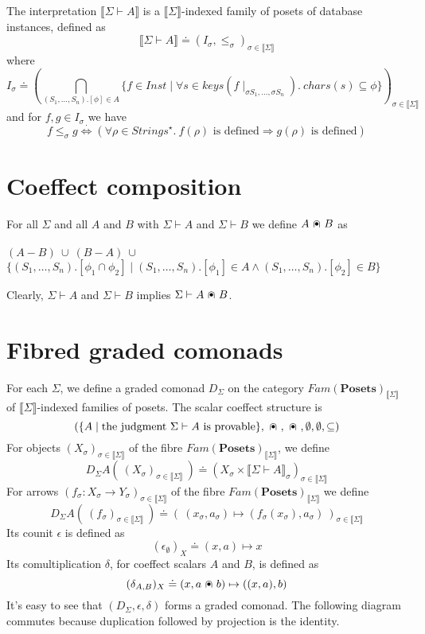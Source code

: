 \documentclass{article}
\newcommand{\mbf}{\mathbf}
\newcommand{\sem}[1]{\llbracket #1 \rrbracket}
\newcommand{\capdot}{~\stackinset{c}{}{c}{}{\scalebox{0.8}{$\bullet$}}{$\cap$}~}
\newcommand{\sdisp}[1]{
\left( #1 \right)
}
\begin{document}
The interpretation $\sem{\Sigma \vdash A}$ is a $\sem{\Sigma}$-indexed family of posets of database instances, defined as $$\sem{\Sigma \vdash A} \doteq (I_\sigma, \leq_\sigma)_{\sigma \in \sem{\Sigma}}$$ where $$I_\sigma \doteq \sdisp{\bigcap_{(S_1,\ldots,S_n).[\phi] \in A} \{ f \in \mathit{Inst} \mid \forall s \in \mathit{keys}(f \! \mid_{\sigma S_1, \ldots, \sigma S_n}).~\mathit{chars}(s) \subseteq \phi \}}_{\sigma \in \sem{\Sigma}}$$ and for $f,g \in I_{\sigma}$ we have
$$f \leq_\sigma g \overset{\cdot}{\Leftrightarrow} (\forall \rho \in \mathit{Strings}^\star.~f(\rho) \text{ is defined} \Rightarrow g(\rho) \text{ is defined})$$
 
\section*{Coeffect composition}

For all $\Sigma$ and all $A$ and $B$ with $\Sigma \vdash A$ and $\Sigma \vdash B$ we define $A \capdot B$ as\\~\\
$(A - B)~\cup~(B - A)~\cup$\\
$\{ (S_1,\ldots,S_n).[\phi_1 \cap \phi_2] \mid (S_1,\ldots,S_n).[\phi_1] \in A \wedge (S_1,\ldots,S_n).[\phi_2] \in B \}$ 

Clearly, $\Sigma \vdash A$ and $\Sigma \vdash B$ implies $\Sigma \vdash A \capdot B$. 
\section*{Fibred graded comonads}
 
For each $\Sigma$, we define a graded comonad $D_{\Sigma}$ on the category $\mathit{Fam}(\mbf{Posets})_{\sem{\Sigma}}$ of $\sem{\Sigma}$-indexed families of posets. The scalar coeffect structure is $$( \{ A \mid \text{the judgment } \Sigma \vdash A \text{ is provable} \}, \capdot, \capdot, \emptyset, \emptyset, \subseteq)$$ For objects $(X_\sigma)_{\sigma \in \sem{\Sigma}}$ of the fibre $\mathit{Fam}(\mbf{Posets})_{\sem{\Sigma}}$, we define $$D_{\Sigma} A(~(X_\sigma)_{\sigma \in \sem{\Sigma}}~) \doteq (X_\sigma \times \sem{\Sigma \vdash A}_\sigma)_{\sigma \in \sem{\Sigma}}$$ For arrows $(f_\sigma : X_\sigma \to Y_\sigma)_{\sigma \in \sem{\Sigma}}$ of the fibre $\mathit{Fam}(\mbf{Posets})_{\sem{\Sigma}}$ we define $$D_{\Sigma} A(~(f_\sigma)_{\sigma \in \sem{\Sigma}}~) \doteq (~(x_\sigma, a_\sigma) \mapsto (f_\sigma(x_\sigma),a_\sigma)~)_{\sigma \in \sem{\Sigma}}$$ Its counit $\epsilon$ is defined as $$(\epsilon_{\emptyset})_X \doteq (x,a) \mapsto x
$$ Its comultiplication $\delta$, for coeffect scalars $A$ and $B$, is defined as $$(\delta_{A,B})_X \doteq (x,a \capdot b) \mapsto ((x, a), b)$$ 
It's easy to see that $(D_{\Sigma}, \epsilon, \delta)$ forms a graded comonad. The following diagram commutes because duplication followed by projection is the identity.
\end{document}
